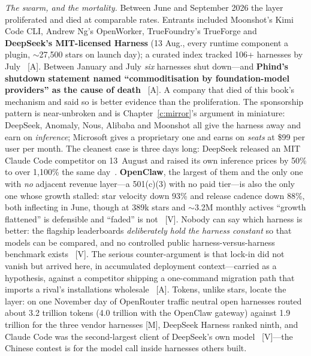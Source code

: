 \emph{The swarm, and the mortality.} Between June and September 2026 the layer proliferated and died at comparable rates. Entrants included Moonshot's Kimi Code CLI, Andrew Ng's OpenWorker, TrueFoundry's TrueForge and \textbf{DeepSeek's MIT-licensed Harness} (13 Aug., every runtime component a plugin, $\sim$27,500 stars on launch day); a curated index tracked 106+ harnesses by July~\cite{harness-field} [A]. Between January and July \emph{six} harnesses shut down---and \textbf{Phind's shutdown statement named ``commoditisation by foundation-model providers'' as the cause of death}~\cite{harness-mortality} [A]. A company that died of this book's mechanism and said so is better evidence than the proliferation. The sponsorship pattern is near-unbroken and is Chapter~\ref{c:mirror}'s argument in miniature: DeepSeek, Anomaly, Nous, Alibaba and Moonshot all give the harness away and earn on \emph{inference}; Microsoft gives a proprietary one and earns on \emph{seats} at \$99 per user per month. The cleanest case is three days long: DeepSeek released an MIT Claude Code competitor on 13~August and raised its own inference prices by 50\% to over 1,100\% the same day~\cite{harness-sponsors}. \textbf{OpenClaw}, the largest of them and the only one with \emph{no} adjacent revenue layer---a 501(c)(3) with no paid tier---is also the only one whose growth stalled: star velocity down 93\% and release cadence down 88\%, both inflecting in June, though at 389k stars and $\sim$3.2M monthly actives ``growth flattened'' is defensible and ``faded'' is not~\cite{openclaw,openclaw-plateau} [V]. Nobody can say which harness is better: the flagship leaderboards \emph{deliberately hold the harness constant} so that models can be compared, and no controlled public harness-versus-harness benchmark exists~\cite{harness-nobench} [V]. The serious counter-argument is that lock-in did not vanish but arrived here, in accumulated deployment context---carried as a hypothesis, against a competitor shipping a one-command migration path that imports a rival's installations wholesale~\cite{harness-lockin} [A]. Tokens, unlike stars, locate the layer: on one November day of OpenRouter traffic neutral open harnesses routed about 3.2 trillion tokens (4.0 trillion with the OpenClaw gateway) against 1.9 trillion for the three vendor harnesses [M], DeepSeek Harness ranked ninth, and Claude Code was the second-largest client of DeepSeek's own model~\cite{mdl-openrouter-oct26,mdl-openrouter-apps} [V]---the Chinese contest is for the model call inside harnesses others built.

